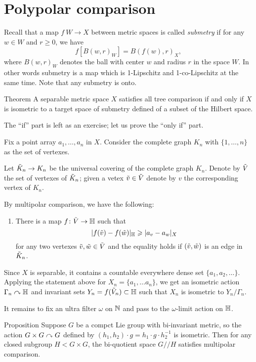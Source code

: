 \section{Polypolar comparison}\label{sec:all-tree}

Recall that a map $f\:W\to X$ between metric spaces is called \emph{submetry} if for any $w\in W$ and $r\ge 0$, we have 
\[f[B(w,r)_W]=B(f(w),r)_X,\]
where $B(w,r)_W$ denotes the ball with center $w$ and radius $r$ in the space $W$.
In other words submetry is a map which is 1-Lipschitz and 1-co-Lipschitz at the same time.
Note that any submetry is onto. 

\begin{thm}{Theorem}\label{thm:hilbert-quotient}
A separable metric space $X$ satisfies all tree comparison if and only if
$X$ is isometric to a target space of submetry defined of a subset  of the Hilbert space.
\end{thm}



The ``if'' part is left as an exercise;
let us prove the ``only if'' part.

Fix a point array $a_1,\dots, a_n$ in $X$.
Consider the complete graph $K_n$ with $\{1,\dots,n\}$ as the set of vertexes.


Let $\~ K_n\to K_n$ be the universal covering of the complete graph $K_n$.
Denote by $\~ V$ the set of vertexes of $\~ K_n$;
given a vetex $\~ v\in\~V$ denote by $v$ the corresponding vertex of $K_n$.

By multipolar comparison, we have the following:

\begin{enumerate}[$({*})$]
\item There is a map $f\:\~V\to\HH$ such that 
\[|f(\~v)-f(\~w)|_\HH\ge |a_v-a_w|_X\]
for any two vertexes $\~v,\~w\in \~ V$ and the equality holds if $(\~v,\~w)$ is an edge in $\~ K_n$.
\end{enumerate}

Since $X$ is separable, it contains a countable everywhere dense set $\{a_1,a_2,\dots\}$. 
Applying the statement above for $X_n=\{a_1,\dots a_n\}$, we get an isometric action $\Gamma_n\acts\HH$ and invariant sets $Y_n=f(\~V_n)\subset \HH$ such that $X_n$ is isometric to $Y_n/\Gamma_n$.

It remains to fix an ultra filter $\omega$ on $\NN$ and pass to the $\omega$-limit action on $\HH$. %
\qeds

\begin{thm}{Proposition}
Suppose $G$ be a compct Lie group with bi-invariant metric, so the action $G\times G\acts G$ defined by $(h_1,h_2)\cdot g=h_1\cdot g\cdot  h_2^{-1}$ is isometric. 
Then for any closed subgroup $H<G\times G$, the bi-quotient space $G/\!\!/H$ satisfies multipolar comparison.
\end{thm}

